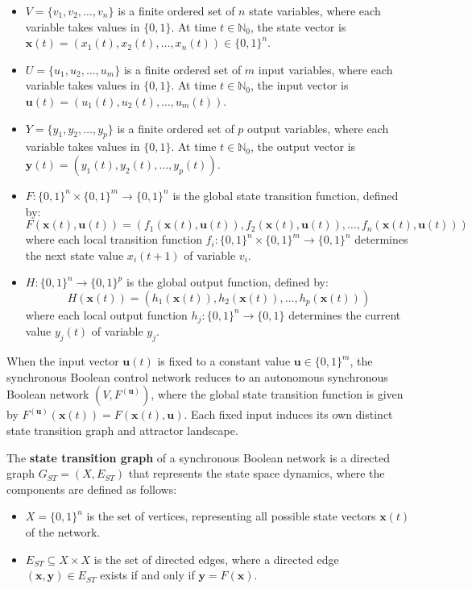 \documentclass[sigconf]{acmart}
\begin{document}
\begin{itemize}
    \item $V = \{v_1, v_2, \dots, v_n\}$ is a finite ordered set of $n$ state variables, where each variable takes values in $\{0, 1\}$. At time $t \in \mathbb{N}_0$, the state vector is $\mathbf{x}(t) = (x_1(t), x_2(t), \dots, x_n(t)) \in \{0, 1\}^n$.
    \item $U = \{u_1, u_2, \dots, u_m\}$ is a finite ordered set of $m$ input variables, where each variable takes values in $\{0, 1\}$. At time $t \in \mathbb{N}_0$, the input vector is $\mathbf{u}(t) = (u_1(t), u_2(t), \dots, u_m(t))$.
    \item $Y = \{y_1, y_2, \dots, y_p\}$ is a finite ordered set of $p$ output variables, where each variable takes values in $\{0, 1\}$. At time $t \in \mathbb{N}_0$, the output vector is $\mathbf{y}(t) = (y_1(t), y_2(t), \dots, y_p(t))$.
    \item $F: \{0, 1\}^n \times \{0, 1\}^m \rightarrow \{0, 1\}^n$ is the global state transition function, defined by:
    $$
    F(\mathbf{x}(t), \mathbf{u}(t)) = (f_1(\mathbf{x}(t), \mathbf{u}(t)), f_2(\mathbf{x}(t), \mathbf{u}(t)), \dots, f_n(\mathbf{x}(t), \mathbf{u}(t)))
    $$
    where each local transition function $f_i: \{0, 1\}^n \times \{0, 1\}^m \rightarrow \{0, 1\}^n$ determines the next state value $x_i(t + 1)$ of variable $v_i$.
    \item $H: \{0, 1\}^n \rightarrow \{0, 1\}^p$ is the global output function, defined by:
    $$
    H(\mathbf{x}(t)) = (h_1(\mathbf{x}(t)), h_2(\mathbf{x}(t)), \dots, h_p(\mathbf{x}(t)))
    $$
    where each local output function $h_j: \{0, 1\}^n \rightarrow \{0, 1\}$ determines the current value $y_j(t)$ of variable $y_j$.
\end{itemize}

When the input vector $\mathbf{u}(t)$ is fixed to a constant value $\mathbf{u} \in \{0, 1\}^m$, the synchronous Boolean control network reduces to an autonomous synchronous Boolean network $(V, F^{(\mathbf{u})})$, where the global state transition function is given by $F^{(\mathbf{u})}(\mathbf{x}(t)) = F(\mathbf{x}(t), \mathbf{u})$. Each fixed input induces its own distinct state transition graph and attractor landscape.

The \textbf{state transition graph} of a synchronous Boolean network is a directed graph $G_{ST} = (X, E_{ST})$ that represents the state space dynamics, where the components are defined as follows:
\begin{itemize}
    \item $X = \{0, 1\}^n$ is the set of vertices, representing all possible state vectors $\mathbf{x}(t)$ of the network.
    \item $E_{ST} \subseteq X \times X$ is the set of directed edges, where a directed edge $(\mathbf{x}, \mathbf{y}) \in E_{ST}$ exists if and only if $\mathbf{y} = F(\mathbf{x})$.
\end{itemize}
\end{document}
